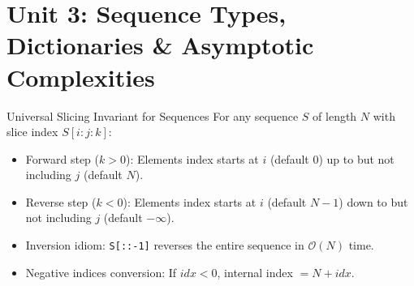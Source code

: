 \chapter{Unit 3: Sequence Types, Dictionaries \& Asymptotic Complexities}

\begin{formulabox}{Universal Slicing Invariant for Sequences}
For any sequence $S$ of length $N$ with slice index $S[i:j:k]$:
\begin{itemize}[leftmargin=1.5em, itemsep=2pt]
    \item Forward step ($k > 0$): Elements index starts at $i$ (default $0$) up to but not including $j$ (default $N$).
    \item Reverse step ($k < 0$): Elements index starts at $i$ (default $N-1$) down to but not including $j$ (default $-\infty$).
    \item Inversion idiom: \texttt{S[::-1]} reverses the entire sequence in $\mathcal{O}(N)$ time.
    \item Negative indices conversion: If $idx < 0$, internal index $= N + idx$.
\end{itemize}
\end{formulabox}

